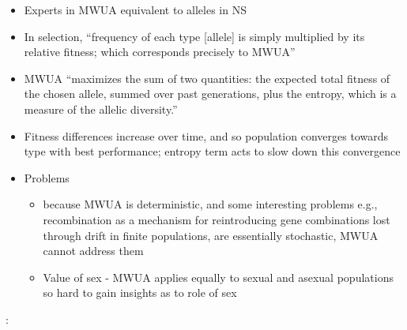 \begin{itemize}
	\item
	
	Experts in MWUA equivalent to alleles in NS
	
	\item
	
	In selection, ``frequency of each type {[}allele{]} is simply
	multiplied by its relative fitness; which corresponds precisely to
	MWUA''
	
	\item
	
	MWUA ``maximizes the sum of two quantities: the expected total fitness
	of the chosen allele, summed over past generations, plus the entropy,
	which is a measure of the allelic diversity.''
	
	\item
	
	Fitness differences increase over time, and so population converges
	towards type with best performance; entropy term acts to slow down
	this convergence
	
	\item
	
	Problems
	
	
	\begin{itemize}
		\item
		
		because MWUA is deterministic, and some interesting problems e.g.,
		recombination as a mechanism for reintroducing gene combinations
		lost through drift in finite populations, are essentially
		stochastic, MWUA cannot address them
		
		\item
		
		Value of sex - MWUA applies equally to sexual and asexual
		populations so hard to gain insights as to role of sex
		
	\end{itemize}
\end{itemize}

\autocite{Chastain2014}:

